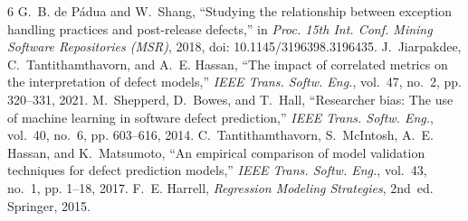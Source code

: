 \documentclass[conference]{IEEEtran}
\begin{document}
\begin{thebibliography}{6}
\footnotesize
{}
G.~B. de P\'adua and W.~Shang, ``Studying the relationship between exception handling practices and post-release defects,'' in \emph{Proc. 15th Int. Conf. Mining Software Repositories (MSR)}, 2018, doi: 10.1145/3196398.3196435.
J.~Jiarpakdee, C.~Tantithamthavorn, and A.~E. Hassan, ``The impact of correlated metrics on the interpretation of defect models,'' \emph{IEEE Trans. Softw. Eng.}, vol.~47, no.~2, pp. 320--331, 2021.
M.~Shepperd, D.~Bowes, and T.~Hall, ``Researcher bias: The use of machine learning in software defect prediction,'' \emph{IEEE Trans. Softw. Eng.}, vol.~40, no.~6, pp. 603--616, 2014.
C.~Tantithamthavorn, S.~McIntosh, A.~E. Hassan, and K.~Matsumoto, ``An empirical comparison of model validation techniques for defect prediction models,'' \emph{IEEE Trans. Softw. Eng.}, vol.~43, no.~1, pp. 1--18, 2017.
F.~E. Harrell, \emph{Regression Modeling Strategies}, 2nd~ed. Springer, 2015.
\end{thebibliography}
\end{document}
